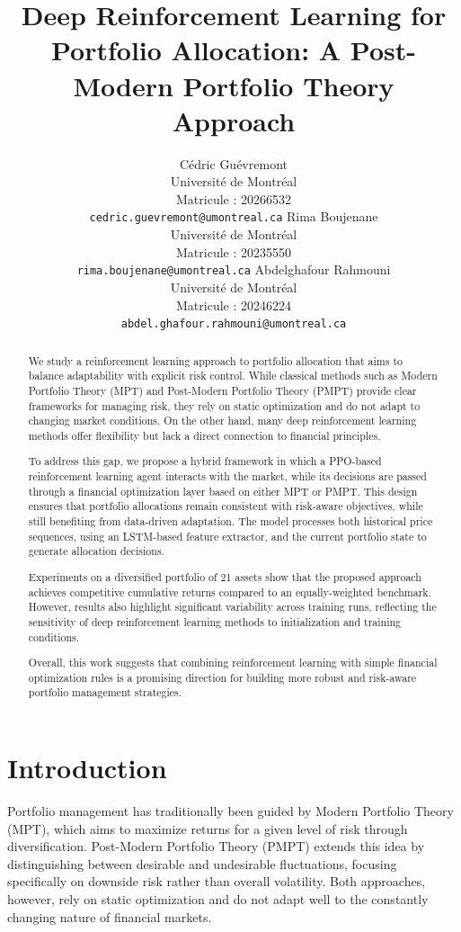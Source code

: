 \documentclass[final]{article}
\title{Deep Reinforcement Learning for Portfolio Allocation: A Post-Modern Portfolio Theory Approach}
\author{
    Cédric Guévremont \\
    Université de Montréal \\
    Matricule : 20266532 \\
    \texttt{cedric.guevremont@umontreal.ca}
    \And
    Rima Boujenane \\
    Université de Montréal \\
     Matricule : 20235550 \\
    \texttt{rima.boujenane@umontreal.ca}
    \And
    Abdelghafour Rahmouni \\
    Université de Montréal \\
    Matricule : 20246224 \\
    \texttt{abdel.ghafour.rahmouni@umontreal.ca}
}
\begin{document}
\maketitle

\begin{abstract}

We study a reinforcement learning approach to portfolio allocation that aims to balance adaptability with explicit
risk control. While classical methods such as Modern Portfolio Theory (MPT) and Post-Modern Portfolio Theory (PMPT)
provide clear frameworks for managing risk, they rely on static optimization and do not adapt to changing market
conditions. On the other hand, many deep reinforcement learning methods offer flexibility but lack a direct connection
to financial principles.

To address this gap, we propose a hybrid framework in which a PPO-based reinforcement learning agent interacts with the
market, while its decisions are passed through a financial optimization layer based on either MPT or PMPT. This design
ensures that portfolio allocations remain consistent with risk-aware objectives, while still benefiting from
data-driven adaptation. The model processes both historical price sequences, using an LSTM-based feature extractor, and
the current portfolio state to generate allocation decisions.

Experiments on a diversified portfolio of 21 assets show that the proposed approach achieves competitive cumulative
returns compared to an equally-weighted benchmark. However, results also highlight significant variability across
training runs, reflecting the sensitivity of deep reinforcement learning methods to initialization and training conditions.

Overall, this work suggests that combining reinforcement learning with simple financial optimization rules is a
promising direction for building more robust and risk-aware portfolio management strategies.

\end{abstract}

\section{Introduction}
Portfolio management has traditionally been guided by Modern Portfolio Theory (MPT), which aims to maximize returns for
a given level of risk through diversification. Post-Modern Portfolio Theory (PMPT) extends this idea by distinguishing
between desirable and undesirable fluctuations, focusing specifically on downside risk rather than overall volatility.
Both approaches, however, rely on static optimization and do not adapt well to the constantly changing nature of
financial markets.
\end{document}
